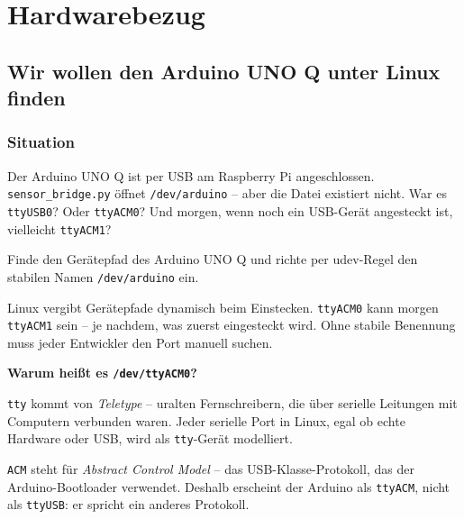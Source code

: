 \part{Hardwarebezug}

\chapter{Wir wollen den Arduino UNO Q unter Linux finden}

\kapitelstruktur

\section{Situation}

Der Arduino UNO Q ist per USB am Raspberry Pi angeschlossen.
\texttt{sensor\_bridge.py} öffnet \texttt{/dev/arduino} --
aber die Datei existiert nicht. War es \texttt{ttyUSB0}?
Oder \texttt{ttyACM0}? Und morgen, wenn noch ein
USB-Gerät angesteckt ist, vielleicht \texttt{ttyACM1}?

\begin{aufgabeBox}
Finde den Gerätepfad des Arduino UNO Q und richte per
udev-Regel den stabilen Namen \texttt{/dev/arduino} ein.
\end{aufgabeBox}

\begin{problemBox}
Linux vergibt Gerätepfade dynamisch beim Einstecken.
\texttt{ttyACM0} kann morgen \texttt{ttyACM1} sein -- je nachdem,
was zuerst eingesteckt wird. Ohne stabile Benennung muss
jeder Entwickler den Port manuell suchen.
\end{problemBox}

\begin{haubeBox}
\textbf{Warum heißt es \texttt{/dev/ttyACM0}?}

\texttt{tty} kommt von \textit{Teletype} -- uralten Fernschreibern,
die über serielle Leitungen mit Computern verbunden waren.
Jeder serielle Port in Linux, egal ob echte Hardware oder USB,
wird als \texttt{tty}-Gerät modelliert.

\texttt{ACM} steht für \textit{Abstract Control Model} --
das USB-Klasse-Protokoll, das der Arduino-Bootloader verwendet.
Deshalb erscheint der Arduino als \texttt{ttyACM},
nicht als \texttt{ttyUSB}: er spricht ein anderes Protokoll.
\end{haubeBox}

